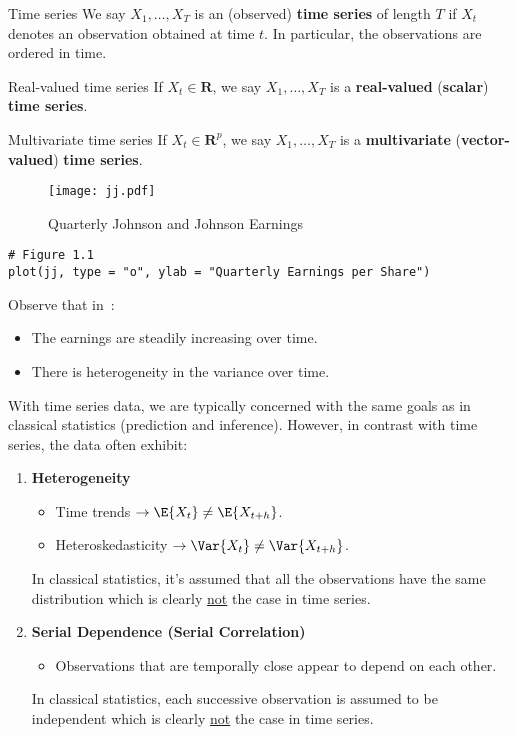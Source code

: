 \begin{Definition}{Time series}{}
    We say $ X_1,\ldots,X_T $ is an (observed)
    \textbf{time series} of length $ T $ if $ X_t $
    denotes an observation obtained at time $ t $.
    In particular, the observations are ordered in time.
\end{Definition}
\begin{Definition}{Real-valued time series}{}
    If $ X_t\in\mathbf{R} $, we say $ X_1,\ldots,X_T $ is
    a \textbf{real-valued} (\textbf{scalar}) \textbf{time series}.
\end{Definition}
\begin{Definition}{Multivariate time series}{}
    If $ X_t\in\mathbf{R}^p $, we say $ X_1,\ldots,X_T $
    is a \textbf{multivariate} (\textbf{vector-valued})
    \textbf{time series}.
\end{Definition}

\begin{figure}[!ht]
    \centering
    \texttt{[image: jj.pdf]}
    \caption{Quarterly Johnson and Johnson Earnings}\label{fig:jj}
\end{figure}
\begin{verbatim}
# Figure 1.1
plot(jj, type = "o", ylab = "Quarterly Earnings per Share")
\end{verbatim}
Observe that in~:
\begin{itemize}
    \item The earnings are steadily increasing over time.
    \item There is heterogeneity in the variance over time.
\end{itemize}

With time series data, we are typically concerned
with the same goals as in classical statistics (prediction and inference).
However, in contrast with time series, the data often exhibit:
\begin{enumerate}[(1)]
    \item \textbf{Heterogeneity}
          \begin{itemize}
              \item Time trends $ \rightarrow \E{X_t}\neq \E{X_{t+h}} $.
              \item Heteroskedasticity
                    $ \rightarrow \Var{X_t}\neq \Var{X_{t+h}} $.
          \end{itemize}
          {\color{blue}In classical statistics, it's assumed that all the observations have the
          same distribution which is clearly \underline{not} the case in time series.}
    \item \textbf{Serial Dependence (Serial Correlation)}
          \begin{itemize}
              \item Observations that are temporally close appear to depend
                    on each other.
          \end{itemize}
          {\color{blue}In classical statistics, each successive observation is assumed
          to be independent which is clearly \underline{not} the case in time series.}
\end{enumerate}

